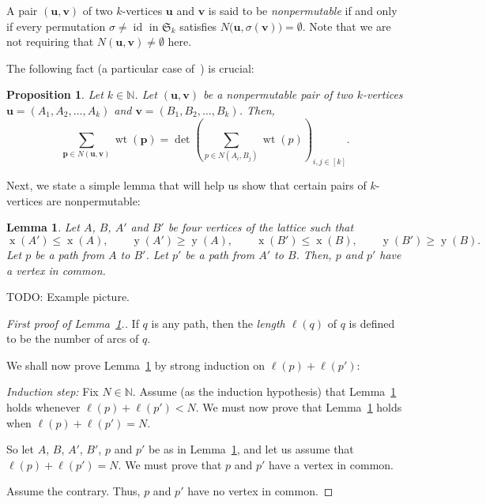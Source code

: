 \documentclass[reqno]{amsart}
\newcommand{\0}{\phantom{c}}
\newcommand{\SymGp}[1]{\mathfrak{S}_{#1}} %
\DeclareMathOperator{\wt}{wt} %
\DeclareMathOperator{\xcoord}{x} %
\DeclareMathOperator{\ycoord}{y} %
\DeclareMathOperator{\id}{id} %
\newcommand{\pp}{\mathbf{p}}
\newcommand{\uu}{\mathbf{u}}
\newcommand{\vv}{\mathbf{v}}
\newcommand{\NN}{\mathbb{N}}
\let\sumnonlimits\sum
\renewcommand{\sum}{\sumnonlimits\limits}
\newenvironment{verlong}{}{}
\newcommand{\tup}[1]{\left( #1 \right)}
\newcommand{\ive}[1]{\left[ #1 \right]}
\newcommand{\defn}[1]{{\color{darkred}\emph{#1}}} %
\theoremstyle{plain}
\newtheorem{lemma}[thm]{Lemma}
\newtheorem{prop}[thm]{Proposition}
\theoremstyle{definition}
\numberwithin{equation}{section}
\begin{document}
\begin{verlong}
A pair $(\uu, \vv)$ of two $k$-vertices $\uu$ and $\vv$ is said to be \defn{nonpermutable} if and only
if every permutation $\sigma \neq \id$ in $\SymGp{k}$ satisfies $N\bigl( \uu,\sigma(\vv) \bigr) = \emptyset$.
Note that we are not requiring that $N(\uu, \vv) \neq \emptyset$ here.

The following fact (a particular case of~\cite[Corollary 2]{GesVie89}) is crucial:

\begin{prop}
\label{prop.LGV.nonper}
Let $k \in \NN$.
Let $(\uu, \vv)$ be a nonpermutable pair of two $k$-vertices $\uu = \tup{A_1, A_2, \dotsc, A_k}$ and $\vv = \tup{B_1, B_2, \dotsc, B_k}$.
Then,
\[
\sum_{\pp \in N(\uu,\vv)} \wt(\pp) = \det\left( \sum_{p \in N(A_i,B_j)} \wt(p) \right)_{i, j \in \ive{k}}.
\]
\end{prop}

Next, we state a simple lemma that will help us show that certain pairs of $k$-vertices are nonpermutable:

\begin{lemma}
\label{lem.LGV.hex}
Let $A$, $B$, $A'$ and $B'$ be four vertices of the lattice such that
\[
\xcoord(A') \leq \xcoord(A), \qquad \ycoord(A') \geq \ycoord(A), \qquad
\xcoord(B') \leq \xcoord(B), \qquad \ycoord(B') \geq \ycoord(B).
\]
Let $p$ be a path from $A$ to $B'$. Let $p'$ be a path from $A'$ to $B$.
Then, $p$ and $p'$ have a vertex in common.
\end{lemma}

TODO: Example picture.

\begin{proof}[First proof of Lemma~\ref{lem.LGV.hex}.]
If $q$ is any path, then the \defn{length $\ell\left(q\right)$} of $q$ is defined to be the number of arcs
of $q$.

We shall now prove Lemma~\ref{lem.LGV.hex} by strong induction on $\ell(p) + \ell(p')$:

\textit{Induction step:}
Fix $N \in \NN$. Assume (as the induction hypothesis) that Lemma~\ref{lem.LGV.hex} holds whenever $\ell(p) + \ell(p') < N$.
We must now prove that Lemma~\ref{lem.LGV.hex} holds when $\ell(p) + \ell(p') = N$.

So let $A$, $B$, $A'$, $B'$, $p$ and $p'$ be as in Lemma~\ref{lem.LGV.hex}, and let us assume that $\ell(p) + \ell(p') = N$.
We must prove that $p$ and $p'$ have a vertex in common.

Assume the contrary. Thus, $p$ and $p'$ have no vertex in common.


\end{proof}
\end{verlong}
\end{document}
